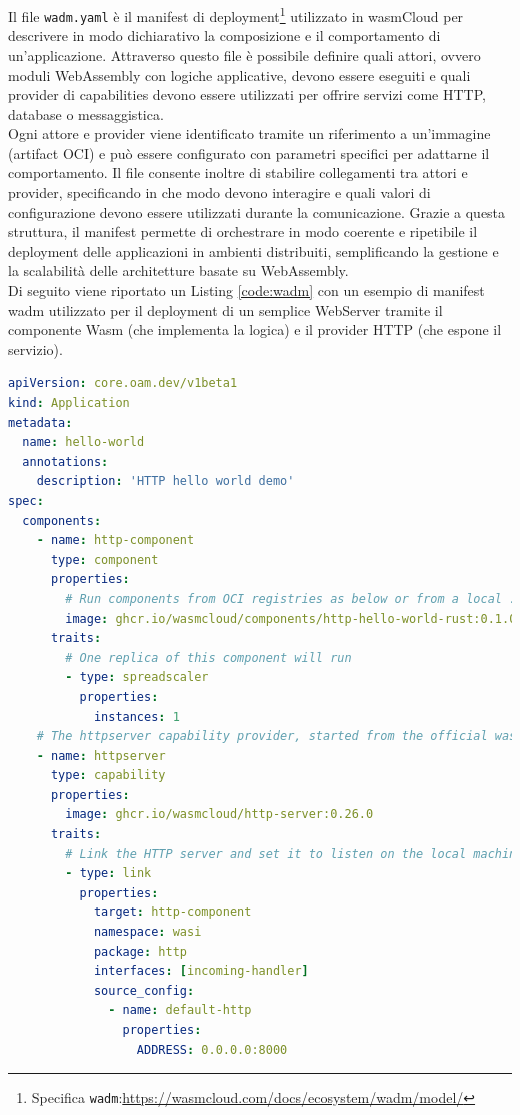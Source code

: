 Il file \texttt{wadm.yaml} è il manifest di deployment\footnote{Specifica \texttt{wadm}:\url{https://wasmcloud.com/docs/ecosystem/wadm/model/}} utilizzato in wasmCloud per descrivere in modo dichiarativo la composizione e il comportamento di un'applicazione. Attraverso questo file è possibile definire quali attori, ovvero moduli WebAssembly con logiche applicative, devono essere eseguiti e quali provider di capabilities devono essere utilizzati per offrire servizi come HTTP, database o messaggistica.\\
Ogni attore e provider viene identificato tramite un riferimento a un'immagine (artifact OCI) e può essere configurato con parametri specifici per adattarne il comportamento. Il file consente inoltre di stabilire collegamenti tra attori e provider, specificando in che modo devono interagire e quali valori di configurazione devono essere utilizzati durante la comunicazione. Grazie a questa struttura, il manifest permette di orchestrare in modo coerente e ripetibile il deployment delle applicazioni in ambienti distribuiti, semplificando la gestione e la scalabilità delle architetture basate su WebAssembly.\\
Di seguito viene riportato un Listing \ref{code:wadm} con un esempio di manifest wadm utilizzato per il deployment di un semplice WebServer tramite il componente Wasm (che implementa la logica) e il provider HTTP (che espone il servizio).

\begin{lstlisting}[language=yaml, caption={Esempio manifest wadm.yaml per un HTTP WebServer\protect\footnotemark}, captionpos=b, label={code:wadm}]
apiVersion: core.oam.dev/v1beta1
kind: Application
metadata:
  name: hello-world
  annotations:
    description: 'HTTP hello world demo'
spec:
  components:
    - name: http-component
      type: component
      properties:
        # Run components from OCI registries as below or from a local .wasm component binary.
        image: ghcr.io/wasmcloud/components/http-hello-world-rust:0.1.0
      traits:
        # One replica of this component will run
        - type: spreadscaler
          properties:
            instances: 1
    # The httpserver capability provider, started from the official wasmCloud OCI artifact
    - name: httpserver
      type: capability
      properties:
        image: ghcr.io/wasmcloud/http-server:0.26.0
      traits:
        # Link the HTTP server and set it to listen on the local machine's port 8080
        - type: link
          properties:
            target: http-component
            namespace: wasi
            package: http
            interfaces: [incoming-handler]
            source_config:
              - name: default-http
                properties:
                  ADDRESS: 0.0.0.0:8000
\end{lstlisting}

